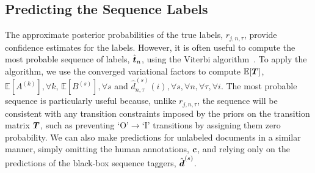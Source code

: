 \subsection{Predicting the Sequence Labels}

The approximate posterior probabilities of the true labels, $r_{j,n,\tau}$, provide confidence estimates for the labels. However, it is often useful to  compute 
the most probable sequence of labels, $\hat{\boldsymbol t}_n$, using the
Viterbi algorithm~\cite{viterbi1967error}. 
To apply the algorithm, we use the converged variational factors to compute 
$\mathbb{E}[\boldsymbol T]$, $\mathbb{E}[A^{(k)}],\forall k$, $\mathbb{E}[B^{(s)}],\forall s$ and
$\hat{d}_{n,\tau}^{(s)}(i), \forall s, \forall n, \forall \tau, \forall i$.
The most probable sequence is particularly useful because, unlike $r_{j,n,\tau}$,
the sequence will be consistent with any transition 
constraints imposed by the priors on the transition matrix $\boldsymbol T$, 
such as preventing `O'$\rightarrow$`I' transitions by assigning them zero probability.
We can also make predictions for unlabeled documents in a similar manner,
simply omitting the human annotations, $\boldsymbol c$, and relying only on the predictions
of the black-box sequence taggers, $\hat{\boldsymbol d}^{(s)}$.

